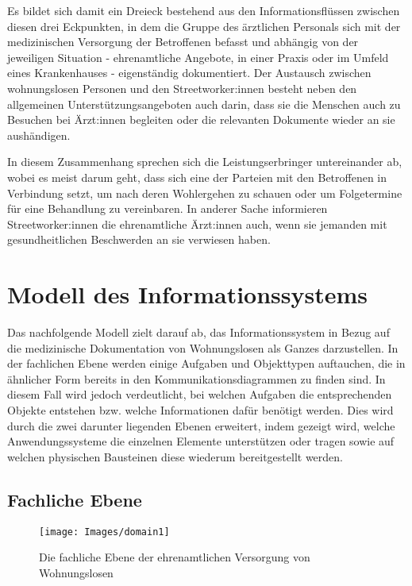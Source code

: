 Es bildet sich damit ein Dreieck bestehend aus den Informationsflüssen zwischen diesen drei Eckpunkten, in dem die Gruppe des ärztlichen Personals sich mit der medizinischen Versorgung der Betroffenen befasst und abhängig von der jeweiligen Situation - ehrenamtliche Angebote, in einer Praxis oder im Umfeld eines Krankenhauses - eigenständig dokumentiert. Der Austausch zwischen wohnungslosen Personen und den Streetworker:innen besteht neben den allgemeinen Unterstützungsangeboten auch darin, dass sie die Menschen auch zu Besuchen bei Ärzt:innen begleiten oder die relevanten Dokumente wieder an sie aushändigen.

In diesem Zusammenhang sprechen sich die Leistungserbringer untereinander ab, wobei es meist darum geht, dass sich eine der Parteien mit den Betroffenen in Verbindung setzt, um nach deren Wohlergehen zu schauen oder um Folgetermine für eine Behandlung zu vereinbaren. In anderer Sache informieren Streetworker:innen die ehrenamtliche Ärzt:innen auch, wenn sie jemanden mit gesundheitlichen Beschwerden an sie verwiesen haben.


\section{Modell des Informationssystems}\label{sec:3lgm2model}

Das nachfolgende Modell zielt darauf ab, das Informationssystem in Bezug auf die medizinische Dokumentation von Wohnungslosen als Ganzes darzustellen. In der fachlichen Ebene werden einige Aufgaben und Objekttypen auftauchen, die in ähnlicher Form bereits in den Kommunikationsdiagrammen zu finden sind. In diesem Fall wird jedoch verdeutlicht, bei welchen Aufgaben die entsprechenden Objekte entstehen bzw. welche Informationen dafür benötigt werden. Dies wird durch die zwei darunter liegenden Ebenen erweitert, indem gezeigt wird, welche Anwendungssysteme die einzelnen Elemente unterstützen oder tragen sowie auf welchen physischen Bausteinen diese wiederum bereitgestellt werden.

\subsection{Fachliche Ebene}

\begin{figure}[h]
	\centering
	\texttt{[image: Images/domain1]}
	\caption[Fachliche Ebene - Teil 1]{Die fachliche Ebene der ehrenamtlichen Versorgung von Wohnungslosen}
	\label{fig:domain1}
\end{figure}

